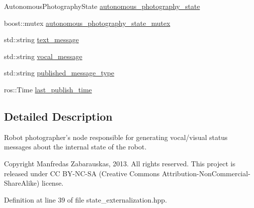 \begin{DoxyCompactItemize}
\item 
\-Autonomous\-Photography\-State \hyperlink{class_r_p_state_externalization_node_abed06c00a68454ce196768a1e5078cee}{autonomous\-\_\-photography\-\_\-state}
\item 
boost\-::mutex \hyperlink{class_r_p_state_externalization_node_a3c18a6613c260be6d1d770c4553de508}{autonomous\-\_\-photography\-\_\-state\-\_\-mutex}
\item 
std\-::string \hyperlink{class_r_p_state_externalization_node_a9d9c064277958b5f4027e62caf85079c}{text\-\_\-message}
\item 
std\-::string \hyperlink{class_r_p_state_externalization_node_a81cda9545dd12f64e184c6b6ebb82368}{vocal\-\_\-message}
\item 
std\-::string \hyperlink{class_r_p_state_externalization_node_a011fc67b3d66b4421136e33837674f6f}{published\-\_\-message\-\_\-type}
\item 
ros\-::\-Time \hyperlink{class_r_p_state_externalization_node_ad1fa73fa64e5dd3488a5d9075c7d1de4}{last\-\_\-publish\-\_\-time}
\end{DoxyCompactItemize}


\subsection{\-Detailed \-Description}
\-Robot photographer's node responsible for generating vocal/visual status messages about the internal state of the robot. 

\begin{DoxyCopyright}{\-Copyright}
\-Manfredas \-Zabarauskas, 2013. \-All rights reserved. \-This project is released under \-C\-C \-B\-Y-\/\-N\-C-\/\-S\-A (\-Creative \-Commons \-Attribution-\/\-Non\-Commercial-\/\-Share\-Alike) license. 
\end{DoxyCopyright}


\-Definition at line 39 of file state\-\_\-externalization.\-hpp.



